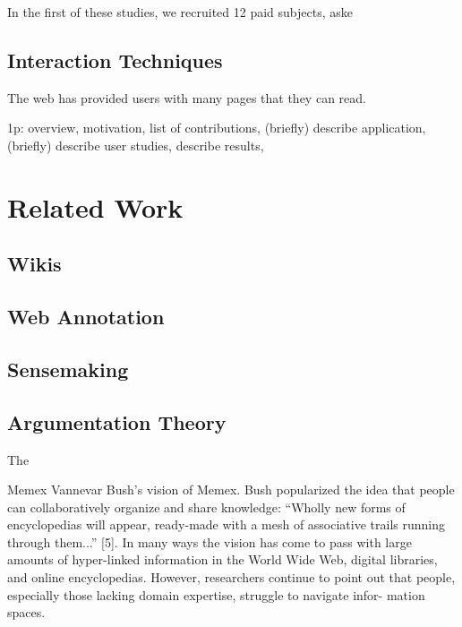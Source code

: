 \documentclass{chi2009}
\newcommand{\studyresult}[1]{{\color{red} STUDY RESULT?: #1}\\}
\begin{document}
In the first of these studies, we recruited 12 paid subjects, aske





\subsection{Interaction Techniques}


The web has provided users with many pages that they can read. 

1p:  
overview, 
motivation,
list of contributions,
(briefly) describe application,
(briefly) describe user studies,
describe results,



\section{Related Work}

\subsection{Wikis}

\subsection{Web Annotation}

\subsection{Sensemaking}

\cite{scenthighlights}\cite{scenttrails}

\subsection{Argumentation Theory}

The 
\cite{Korb97acognitive}
\cite{toulmin}
\cite{carneades}
\cite{conceptmap}
\cite{argmas}

Memex
Vannevar 
Bush's vision of Memex. Bush popularized the idea that 
people can collaboratively organize and share knowledge: 
``Wholly new forms of encyclopedias will appear, ready-made 
with a mesh of associative trails running through them...'' 
[5]. In many ways the vision has come to pass with large 
amounts of hyper-linked information in the World Wide 
Web, digital libraries, and online encyclopedias. However, 
researchers continue to point out that people, especially 
those lacking domain expertise, struggle to navigate infor- 
mation spaces. 
\end{document}
